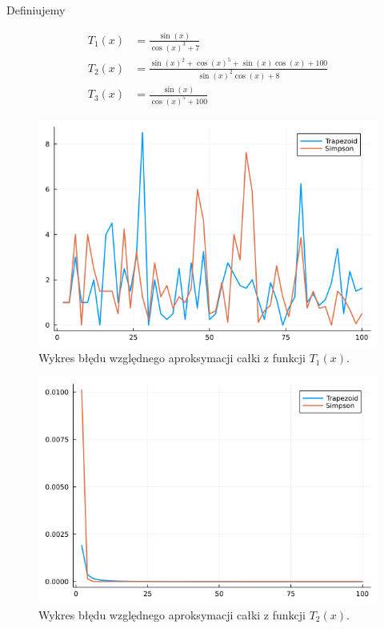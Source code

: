 \documentclass{article}
\theoremstyle{definition}
\begin{document}
Definiujemy

\begin{align*}
    T_1(x) &= \frac{\sin(x)}{\cos(x)^3 + 7} \\
    T_2(x) &= \frac{\sin(x)^2 + \cos(x)^5 + \sin(x)\cos(x) + 100}{\sin(x)^2\cos(x) + 8} \\
    T_3(x) &= \frac{\sin(x)}{\cos(x)^5+100}
\end{align*}


\begin{figure}[h!]
    \centering
    \includegraphics[scale=0.5]{plot_T1.png}
    \caption{Wykres błędu względnego aproksymacji całki z funkcji \(T_1(x)\).}
    \label{fig:plot_T1}
\end{figure}


\begin{figure}[h!]
    \centering
    \includegraphics[scale=0.5]{plot_T2.png}
    \caption{Wykres błędu względnego aproksymacji całki z funkcji \(T_2(x)\).}
    \label{fig:plot_T2}
\end{figure}
\end{document}
